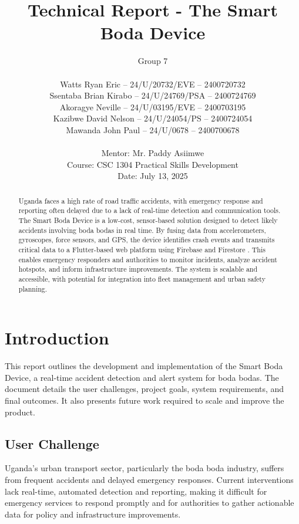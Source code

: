 \documentclass[12pt]{article}
\title{\textbf{Technical Report - The Smart Boda Device}}
\author{
  Group 7 \\
  \\ 
  Watts Ryan Eric -- 24/U/20732/EVE -- 2400720732 \\
  Ssentaba Brian Kirabo -- 24/U/24769/PSA -- 2400724769 \\
  Akoragye Neville -- 24/U/03195/EVE -- 2400703195 \\
  Kazibwe David Nelson -- 24/U/24054/PS -- 2400724054 \\
  Mawanda John Paul -- 24/U/0678 -- 2400700678 \\
  \\ 
  Mentor: Mr. Paddy Asiimwe \\
  Course: CSC 1304 Practical Skills Development \\
  Date: July 13, 2025
}
\date{}
\begin{document}
\maketitle

\vspace{-1em} %

\tableofcontents

\vspace{1em} %

\begin{abstract}
Uganda faces a high rate of road traffic accidents, with emergency response and reporting often delayed due to a lack of real-time detection and communication tools. The Smart Boda Device is a low-cost, sensor-based solution designed to detect likely accidents involving boda bodas in real time. By fusing data from accelerometers, gyroscopes, force sensors, and GPS, the device identifies crash events and transmits critical data to a Flutter-based web platform using Firebase and Firestore \cite{firebase}. This enables emergency responders and authorities to monitor incidents, analyze accident hotspots, and inform infrastructure improvements. The system is scalable and accessible, with potential for integration into fleet management and urban safety planning.
\end{abstract}

\newpage

\section{Introduction}
This report outlines the development and implementation of the Smart Boda Device, a real-time accident detection and alert system for boda bodas. The document details the user challenges, project goals, system requirements, and final outcomes. It also presents future work required to scale and improve the product.

\subsection{User Challenge}
Uganda's urban transport sector, particularly the boda boda industry, suffers from frequent accidents and delayed emergency responses. Current interventions lack real-time, automated detection and reporting, making it difficult for emergency services to respond promptly and for authorities to gather actionable data for policy and infrastructure improvements.
\end{document}
